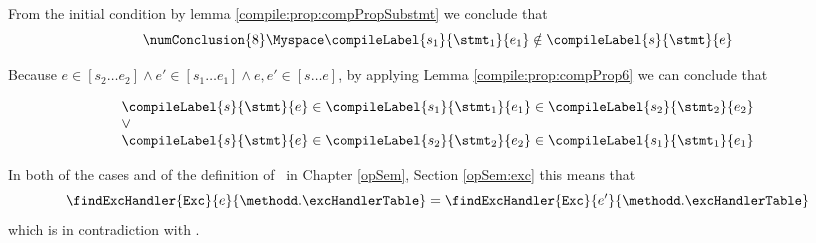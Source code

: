From the initial condition  by lemma \ref{compile:prop:compPropSubstmt}  we conclude that 
$$\numConclusion{8} \Myspace \compileLabel{s_1}{\stmt_1}{e_1} \notin   \compileLabel{s}{\stmt}{e} $$


 Because $e \in [s_2 \ldots e_2 ]  \wedge  e' \in [s_1 \ldots e_1 ] \wedge e,e' \in [s \ldots e]$,  by applying 
  Lemma \ref{compile:prop:compProp6}  we can conclude that

 $$  \begin{array}{l} 
          \compileLabel{s}{\stmt}{e} \in \compileLabel{s_1}{\stmt_1}{e_1} \in  \compileLabel{s_2}{\stmt_2}{e_2} \\
           \vee \\
	 \compileLabel{s}{\stmt}{e} \in   \compileLabel{s_2}{\stmt_2}{e_2} \in \compileLabel{s_1}{\stmt_1}{e_1}
 \end{array}$$	   

 In both of the cases and of the definition of \findExcHandlerOnly \ in Chapter \ref{opSem}, Section \ref{opSem:exc}  this means that 
$$ \findExcHandler{\mbox{\rm\tt{Exc}} }{e}{\methodd.\excHandlerTable} = \findExcHandler{\mbox{\rm\tt{Exc}} }{e'}{\methodd.\excHandlerTable} $$
which is in contradiction with .
\Qed \\
